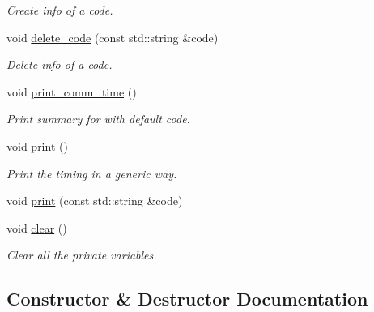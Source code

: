 \begin{DoxyCompactItemize}
\begin{DoxyCompactList}\small\item\em Create info of a code. \end{DoxyCompactList}\item 
void \mbox{\hyperlink{classforte_1_1_d_s_r_g___t_i_m_e_a98c7a9660c0287efba46c64d8a34e4bc}{delete\+\_\+code}} (const std\+::string \&code)
\begin{DoxyCompactList}\small\item\em Delete info of a code. \end{DoxyCompactList}\item 
void \mbox{\hyperlink{classforte_1_1_d_s_r_g___t_i_m_e_a1e02d4e0c3899506956bac26368f77d4}{print\+\_\+comm\+\_\+time}} ()
\begin{DoxyCompactList}\small\item\em Print summary for with default code. \end{DoxyCompactList}\item 
void \mbox{\hyperlink{classforte_1_1_d_s_r_g___t_i_m_e_a37ebe04df7ea97996cb66a69c97d7fbc}{print}} ()
\begin{DoxyCompactList}\small\item\em Print the timing in a generic way. \end{DoxyCompactList}\item 
void \mbox{\hyperlink{classforte_1_1_d_s_r_g___t_i_m_e_aca71fc3d83a5d02707b2f9efe9c88163}{print}} (const std\+::string \&code)
\item 
void \mbox{\hyperlink{classforte_1_1_d_s_r_g___t_i_m_e_afaa13e999c5671b13d6adfa991ad0274}{clear}} ()
\begin{DoxyCompactList}\small\item\em Clear all the private variables. \end{DoxyCompactList}\end{DoxyCompactItemize}


\subsection{Constructor \& Destructor Documentation}
\mbox{\label{classforte_1_1_d_s_r_g___t_i_m_e_a48855e5a550f6071615a20d3fe6c6926}} 
